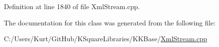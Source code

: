 Definition at line 1840 of file Xml\+Stream.\+cpp.



The documentation for this class was generated from the following file\+:\begin{DoxyCompactItemize}
\item 
C\+:/\+Users/\+Kurt/\+Git\+Hub/\+K\+Square\+Libraries/\+K\+K\+Base/\hyperlink{_xml_stream_8cpp}{Xml\+Stream.\+cpp}\end{DoxyCompactItemize}
